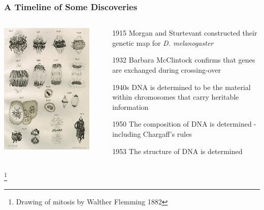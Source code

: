 \documentclass{beamer}
\newcommand\blfootnote[1]{%
	\begingroup
	\renewcommand\thefootnote{}\footnote{#1}%
	\addtocounter{footnote}{-1}%
	\endgroup
}
\begin{document}
\begin{frame}
	\frametitle{A Timeline of Some Discoveries}
	
	\begin{columns}
		\begin{column}{0.4\textwidth}
			\includegraphics[keepaspectratio, width  =\textwidth]{img/chromosomes}
		\end{column}
		\begin{column}{0.6\textwidth}
			\begin{itemize}
				\small
				\item[1915] Morgan and Sturtevant constructed their genetic map for \textit{D. melanogaster}
				\item[1932] Barbara McClintock confirms that genes are exchanged during crossing-over
				\item[1940s] DNA is determined to be the material within chromosomes that carry heritable information
				\item[1950] The composition of DNA is determined - including Chargaff's rules
				\item[1953] The structure of DNA is determined
				
				
			\end{itemize}
		\end{column}
		
	\end{columns}
	\blfootnote{Drawing of mitosis by Walther Flemming 1882}
	
	
\end{frame}	
\end{document}
